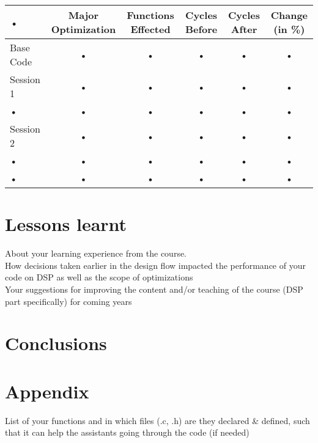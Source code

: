 \documentclass[a4paper]{article}
\begin{document}
\begin{table}
\begin{tabular}{|l|c|c|c|c|c|}
\hline 
• & Major Optimization & Functions Effected & Cycles Before & Cycles After & Change (in \%) \\ 
\hline 
Base Code & • & • & • & • & • \\ 
\hline 
Session 1 & • & • & • & • & • \\ 
\hline 
• & • & • & • & • & • \\ 
\hline 
Session 2 & • & • & • & • & • \\ 
\hline 
• & • & • & • & • & • \\ 
\hline 
• & • & • & • & • & • \\ 
\hline 
\end{tabular} 
\end{table}




\section{Lessons learnt}
About your learning experience from the course.\\
How decisions taken earlier in the design flow impacted the performance of your code on DSP as
well as the scope of optimizations\\
 Your suggestions for improving the content and/or teaching of the course (DSP part specifically) for
coming years

\section{Conclusions}

\section{Appendix}
List of your functions and in which files (.c, .h) are they declared \& defined, such that it can help the assistants going through the code (if needed)
\end{document}
